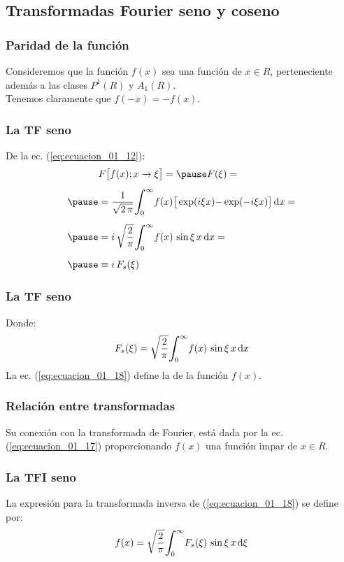 \subsection{Transformadas Fourier seno y coseno}

\begin{frame}
\frametitle{Paridad de la función}
Consideremos que la función $f (x)$ sea una función  de $x \in R$, perteneciente además a las clases $P^{1} (R)$ y $A_{1} (R)$.
\\
\bigskip
\pause
Tenemos claramente que $f(-x) = - f (x)$. 
\end{frame}
\begin{frame}
\frametitle{La TF seno}
De la ec. (\ref{eq:ecuacion_01_12}):
\pause
\begin{eqnarray}
\begin{aligned}[b]
&F \big[ f (x); x \to \xi \big] = \pause F (\xi) = \\[0.5em] \pause
&= \dfrac{1}{\sqrt{2 \, \pi}} \scaleint{6ex}_{\bs 0}^{\infty} f (x) \big[ \exp(i \xi x) {-} \exp(-i \xi x) \big] \dd{x} = \\[0.5em] \pause
&= i \, \sqrt{\dfrac{2}{\pi}} \scaleint{6ex}_{\bs 0}^{\infty} f (x) \, \sin \xi \, x \dd{x} = \\[0.5em] \pause
&\equiv i \, F_{s} (\xi)
\end{aligned}
\label{eq:ecuacion_01_17}
\end{eqnarray}
\end{frame}
\begin{frame}
\frametitle{La TF seno}
Donde:
\pause
\begin{align}
F_{s} (\xi) = \sqrt{\dfrac{2}{\pi}} \scaleint{6ex}_{\bs 0}^{\infty} f (x) \, \sin \xi \, x \dd{x}
\label{eq:ecuacion_01_18}
\end{align}
La ec. (\ref{eq:ecuacion_01_18}) define la  de la función $f (x)$.
\end{frame}
\begin{frame}
\frametitle{Relación entre transformadas}
Su conexión con la transformada de Fourier, está dada por la ec. (\ref{eq:ecuacion_01_17}) proporcionando $f (x)$ una función impar de $x \in R$.
\end{frame}
\begin{frame}
\frametitle{La TFI seno}
La expresión para la transformada inversa de (\ref{eq:ecuacion_01_18}) se define por:
\pause
\begin{align}
f (x) = \sqrt{\dfrac{2}{\pi}} \scaleint{6ex}_{\bs 0}^{\infty} F_{s}(\xi) \, \sin \xi \, x \dd{\xi}
\label{eq:ecuacion_01_19}
\end{align}
\end{frame}
